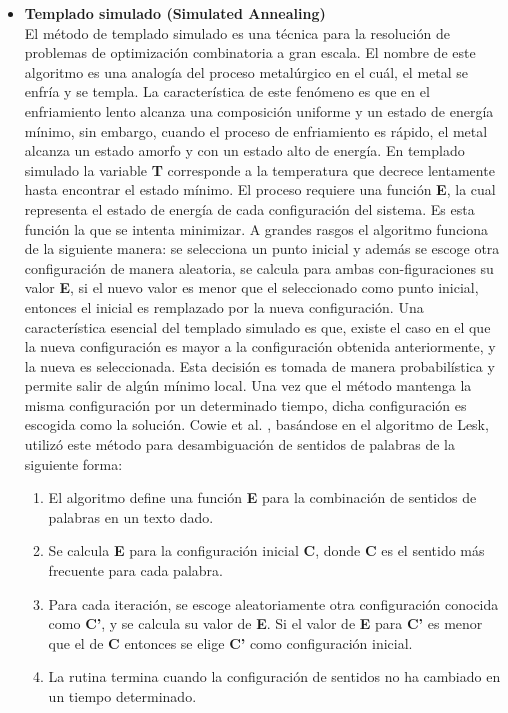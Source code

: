 \begin{itemize}
    \item \textbf{Templado simulado (Simulated Annealing)} \\
    El método de templado simulado es una técnica para la resolución de problemas de optimización combinatoria a gran escala. El nombre de este algoritmo es una analogía del proceso metalúrgico en el cuál, el metal se enfría y se templa. La característica de este fenómeno es que en el enfriamiento lento alcanza una composición uniforme y un estado de energía mínimo, sin embargo, cuando el proceso de enfriamiento es rápido, el metal alcanza un estado amorfo y con un estado alto de energía. En templado simulado la variable \textbf{T} corresponde a la temperatura que decrece lentamente hasta encontrar el estado mínimo. 
    El proceso requiere una función \textbf{E}, la cual representa el estado de energía de cada configuración del sistema. Es esta función la que se intenta minimizar. A grandes rasgos el algoritmo funciona de la siguiente manera: se selecciona un punto inicial y además se escoge otra configuración de manera aleatoria, se calcula para ambas con-figuraciones su valor \textbf{E}, si el nuevo valor es menor que el seleccionado como punto inicial, entonces el inicial es remplazado por la nueva configuración. Una característica esencial del templado simulado es que, existe el caso en el que la nueva configuración es mayor a la configuración obtenida anteriormente, y la nueva es seleccionada. Esta decisión es tomada de manera probabilística y permite salir de algún mínimo local. Una vez que el método mantenga la misma configuración por un determinado tiempo, dicha configuración es escogida como la solución. 
    Cowie et al. \cite{005}, basándose en el algoritmo de Lesk, utilizó este método para desambiguación de sentidos de palabras de la siguiente forma: 
    \begin{enumerate}
      \item El algoritmo define una función \textbf{E} para la combinación de sentidos de palabras en un texto dado. 
      \item Se calcula \textbf{E} para la configuración inicial \textbf{C}, donde \textbf{C} es el sentido más frecuente para cada palabra.
      \item Para cada iteración, se escoge aleatoriamente otra configuración conocida como \textbf{C’}, y se calcula su valor de \textbf{E}. Si el valor de \textbf{E} para \textbf{C’} es menor que el de \textbf{C} entonces se elige \textbf{C’} como configuración inicial.
      \item  La rutina termina cuando la configuración de sentidos no ha cambiado en un tiempo determinado.
    \end{enumerate}
  

\end{itemize}
